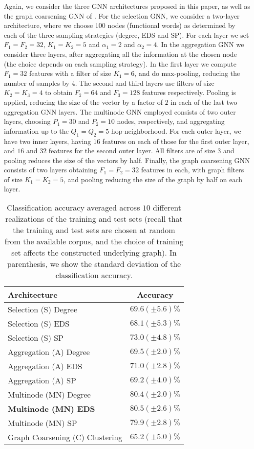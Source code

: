 Again, we consider the three GNN architectures proposed in this paper, as well as the graph coarsening GNN of \cite{defferrard17-cnngraphs}. For the selection GNN, we consider a two-layer architecture, where we choose $100$ nodes (functional words) as determined by each of the three sampling strategies (degree, EDS and SP). For each layer we set $F_{1}=F_{2}=32$, $K_{1}=K_{2}=5$ and $\alpha_{1}=2$ and $\alpha_{2}=4$. In the aggregation GNN we consider three layers, after aggregating all the information at the chosen node (the choice depends on each sampling strategy). In the first layer we compute $F_{1}=32$ features with a filter of size $K_{1}=6$, and do max-pooling, reducing the number of samples by $4$. The second and third layers use filters of size $K_{2}=K_{3}=4$ to obtain $F_{2}=64$ and $F_{3}=128$ features respectively. Pooling is applied, reducing the size of the vector by a factor of $2$ in each of the last two aggregation GNN layers. The multinode GNN employed consists of two outer layers, choosing $P_{1}=30$ and $P_{2}=10$ nodes, respectively, and aggregating information up to the $Q_{1}=Q_{2}=5$ hop-neighborhood. For each outer layer, we have two inner layers, having $16$ features on each of those for the first outer layer, and $16$ and $32$ features for the second outer layer. All filters are of size $3$ and pooling reduces the size of the vectors by half. Finally, the graph coarsening GNN consists of two layers obtaining $F_{1}=F_{2}=32$ features in each, with graph filters of size $K_{1}=K_{2}=5$, and pooling reducing the size of the graph by half on each layer.

\begin{table}
	\centering
\begin{tabular}{lc} \hline
Architecture 				& Accuracy 				\\ \hline
Selection (S) Degree		& $69.6 (\pm 5.6) \%$	\\
Selection (S) EDS			& $68.1 (\pm 5.3) \%$	\\
Selection (S) SP			& $73.0 (\pm 4.8) \%$	\\
Aggregation	(A)	Degree		& $69.5 (\pm 2.0) \%$	\\
Aggregation	(A)	EDS			& $71.0 (\pm 2.8) \%$	\\
Aggregation	(A)	SP			& $69.2 (\pm 4.0) \%$	\\
Multinode (MN) Degree		& $80.4 (\pm 2.0) \%$	\\
\textbf{Multinode (MN) EDS}			& $\mathbf{80.5 (\pm 2.6) \%}$	\\
Multinode (MN) SP			& $79.9 (\pm 2.8) \%$	\\
Graph Coarsening (C) Clustering		& $65.2 (\pm 5.0)\%$ \\ \hline
\end{tabular}
	\caption{Classification accuracy averaged across $10$ different realizations of the training and test sets (recall that the training and test sets are chosen at random from the available corpus, and the choice of training set affects the constructed underlying graph). In parenthesis, we show the standard deviation of the classification accuracy.}
	\label{table_author}
\end{table}

